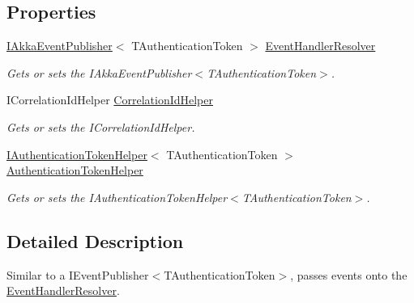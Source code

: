 \subsection*{Properties}
\begin{DoxyCompactItemize}
\item 
\hyperlink{interfaceCqrs_1_1Akka_1_1Events_1_1IAkkaEventPublisher}{I\+Akka\+Event\+Publisher}$<$ T\+Authentication\+Token $>$ \hyperlink{classCqrs_1_1Akka_1_1Events_1_1AkkaEventBusProxy_1_1BusActor_ae7986841b1bb97368936c52655b72f96_ae7986841b1bb97368936c52655b72f96}{Event\+Handler\+Resolver}
\begin{DoxyCompactList}\small\item\em Gets or sets the I\+Akka\+Event\+Publisher$<$\+T\+Authentication\+Token$>$. \end{DoxyCompactList}\item 
I\+Correlation\+Id\+Helper \hyperlink{classCqrs_1_1Akka_1_1Events_1_1AkkaEventBusProxy_1_1BusActor_a4857b2d33de5de94001abf96710b1308_a4857b2d33de5de94001abf96710b1308}{Correlation\+Id\+Helper}
\begin{DoxyCompactList}\small\item\em Gets or sets the I\+Correlation\+Id\+Helper. \end{DoxyCompactList}\item 
\hyperlink{interfaceCqrs_1_1Authentication_1_1IAuthenticationTokenHelper}{I\+Authentication\+Token\+Helper}$<$ T\+Authentication\+Token $>$ \hyperlink{classCqrs_1_1Akka_1_1Events_1_1AkkaEventBusProxy_1_1BusActor_a5a276908d994a77c84e12e73ff73a286_a5a276908d994a77c84e12e73ff73a286}{Authentication\+Token\+Helper}
\begin{DoxyCompactList}\small\item\em Gets or sets the I\+Authentication\+Token\+Helper$<$\+T\+Authentication\+Token$>$. \end{DoxyCompactList}\end{DoxyCompactItemize}


\subsection{Detailed Description}
Similar to a I\+Event\+Publisher$<$\+T\+Authentication\+Token$>$, passes events onto the \hyperlink{classCqrs_1_1Akka_1_1Events_1_1AkkaEventBusProxy_1_1BusActor_ae7986841b1bb97368936c52655b72f96_ae7986841b1bb97368936c52655b72f96}{Event\+Handler\+Resolver}. 



